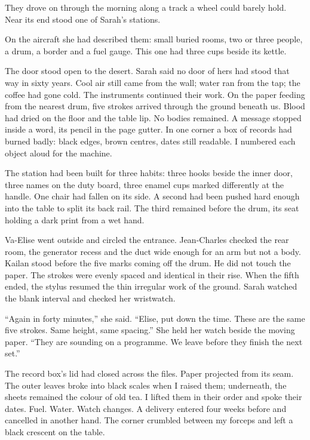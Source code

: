\ornament

They drove on through the morning along a track a wheel could barely hold. Near its end stood one of Sarah's stations.\par

On the aircraft she had described them: small buried rooms, two or three people, a drum, a border and a fuel gauge. This one had three cups beside its kettle.\par

The door stood open to the desert. Sarah said no door of hers had stood that way in sixty years. Cool air still came from the wall; water ran from the tap; the coffee had gone cold. The instruments continued their work. On the paper feeding from the nearest drum, five strokes arrived through the ground beneath us. Blood had dried on the floor and the table lip. No bodies remained. A message stopped inside a word, its pencil in the page gutter. In one corner a box of records had burned badly: black edges, brown centres, dates still readable. I numbered each object aloud for the machine.\par

The station had been built for three habits: three hooks beside the inner door, three names on the duty board, three enamel cups marked differently at the handle. One chair had fallen on its side. A second had been pushed hard enough into the table to split its back rail. The third remained before the drum, its seat holding a dark print from a wet hand.\par

Va-Elise went outside and circled the entrance. Jean-Charles checked the rear room, the generator recess and the duct wide enough for an arm but not a body. Kailan stood before the five marks coming off the drum. He did not touch the paper. The strokes were evenly spaced and identical in their rise. When the fifth ended, the stylus resumed the thin irregular work of the ground. Sarah watched the blank interval and checked her wristwatch.\par

``Again in forty minutes,'' she said. ``Elise, put down the time. These are the same five strokes. Same height, same spacing.'' She held her watch beside the moving paper. ``They are sounding on a programme. We leave before they finish the next set.''\par

The record box's lid had closed across the files. Paper projected from its seam. The outer leaves broke into black scales when I raised them; underneath, the sheets remained the colour of old tea. I lifted them in their order and spoke their dates. Fuel. Water. Watch changes. A delivery entered four weeks before and cancelled in another hand. The corner crumbled between my forceps and left a black crescent on the table.\par

